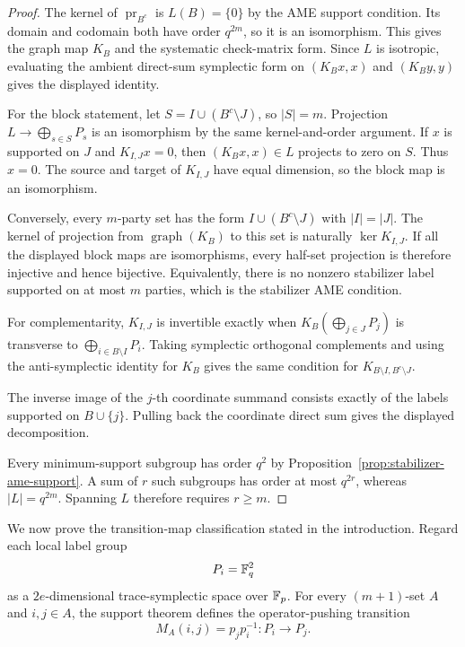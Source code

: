 \begin{proof}
The kernel of \(\operatorname{pr}_{B^c}\) is \(L(B)=\{0\}\) by the AME
support condition.  Its domain and codomain both have order \(q^{2m}\),
so it is an isomorphism.  This gives the graph map \(K_B\) and the
systematic check-matrix form.  Since \(L\) is isotropic, evaluating the
ambient direct-sum symplectic form on \((K_Bx,x)\) and \((K_By,y)\) gives
the displayed identity.

For the block statement, let
\(S=I\cup(B^c\setminus J)\), so \(|S|=m\).  Projection \(L\to
\bigoplus_{s\in S}P_s\) is an isomorphism by the same kernel-and-order
argument.  If \(x\) is supported on \(J\) and \(K_{I,J}x=0\), then
\((K_Bx,x)\in L\) projects to zero on \(S\).  Thus \(x=0\).
The source and target of \(K_{I,J}\) have equal dimension, so the block
map is an isomorphism.

Conversely, every \(m\)-party set has the form
\(I\cup(B^c\setminus J)\) with \(|I|=|J|\).  The kernel of projection
from \(\operatorname{graph}(K_B)\) to this set is naturally
\(\ker K_{I,J}\).  If all the displayed block maps are isomorphisms, every
half-set projection is therefore injective and hence bijective.  Equivalently,
there is no nonzero stabilizer label supported on at most \(m\) parties,
which is the stabilizer AME condition.

For complementarity, \(K_{I,J}\) is invertible exactly when
\(K_B(\bigoplus_{j\in J}P_j)\) is transverse to
\(\bigoplus_{i\in B\setminus I}P_i\).  Taking symplectic orthogonal
complements and using the anti-symplectic identity for \(K_B\) gives the
same condition for \(K_{B\setminus I,B^c\setminus J}\).

The inverse image of the \(j\)-th coordinate
summand consists exactly of the labels supported on \(B\cup\{j\}\).
Pulling back the coordinate direct sum gives the displayed decomposition.

Every minimum-support subgroup has order \(q^2\) by
Proposition~\ref{prop:stabilizer-ame-support}.  A sum of \(r\) such
subgroups has order at most \(q^{2r}\), whereas \(|L|=q^{2m}\).
Spanning \(L\) therefore requires \(r\geq m\).
\end{proof}

We now prove the transition-map classification stated in the introduction.
Regard each local label group
\[
 P_i=\mathbb F_q^2
\]
as a \(2e\)-dimensional trace-symplectic space over \(\mathbb F_p\).  For every
\((m+1)\)-set \(A\) and \(i,j\in A\), the support theorem defines the
operator-pushing transition
\[
 M_A(i,j)=p_jp_i^{-1}:P_i\longrightarrow P_j.
\]
\AMEFigureOne

